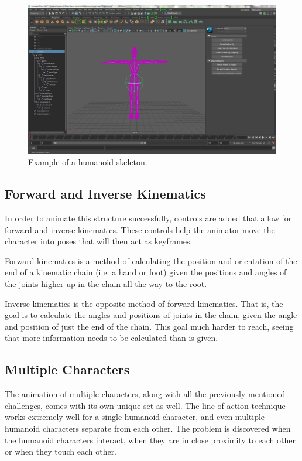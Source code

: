 \documentclass[12pt, a4paper]{memoir}
\begin{document}
\begin{figure}[h!]
\includegraphics[scale=0.3]{img/skeleton}
\caption{Example of a humanoid skeleton.}
\end{figure}

\subsection{Forward and Inverse Kinematics}
In order to animate this structure successfully, controls are added that allow for forward and inverse kinematics. These controls help the animator move the character into poses that will then act as keyframes.

Forward kinematics is a method of calculating the position and orientation of the end of a kinematic chain (i.e. a hand or foot) given the positions and angles of the joints higher up in the chain all the way to the root. 

Inverse kinematics is the opposite method of forward kinematics. That is, the goal is to calculate the angles and positions of joints in the chain, given the angle and position of just the end of the chain. This goal much harder to reach, seeing that more information needs to be calculated than is given.

\subsection{Multiple Characters}
The animation of multiple characters, along with all the previously mentioned challenges, comes with its own unique set as well. The line of action technique works extremely well for a single humanoid character, and even multiple humanoid characters separate from each other. The problem is discovered when the humanoid characters interact, when they are in close proximity to each other or when they touch each other.
\end{document}
